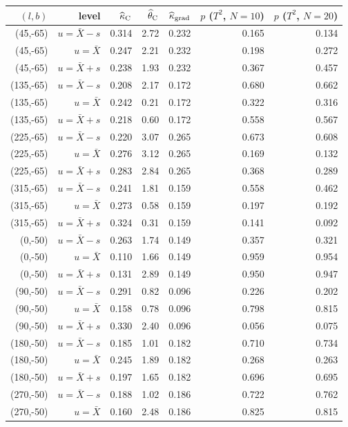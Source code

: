 \begin{tabular}{rrrrrrr}
\hline
$(l,b)$ & level & $\widehat\kappa_{\rm C}$ & $\widehat\theta_{\rm C}$ & $\widehat\kappa_{\rm grad}$ & $p$ ($T^2$, $N=10$) & $p$ ($T^2$, $N=20$) \\
\hline
(45,-65) & $u=\bar X-s$ & 0.314 & 2.72 & 0.232 & 0.165 & 0.134 \\
(45,-65) & $u=\bar X$ & 0.247 & 2.21 & 0.232 & 0.198 & 0.272 \\
(45,-65) & $u=\bar X+s$ & 0.238 & 1.93 & 0.232 & 0.367 & 0.457 \\
(135,-65) & $u=\bar X-s$ & 0.208 & 2.17 & 0.172 & 0.680 & 0.662 \\
(135,-65) & $u=\bar X$ & 0.242 & 0.21 & 0.172 & 0.322 & 0.316 \\
(135,-65) & $u=\bar X+s$ & 0.218 & 0.60 & 0.172 & 0.558 & 0.567 \\
(225,-65) & $u=\bar X-s$ & 0.220 & 3.07 & 0.265 & 0.673 & 0.608 \\
(225,-65) & $u=\bar X$ & 0.276 & 3.12 & 0.265 & 0.169 & 0.132 \\
(225,-65) & $u=\bar X+s$ & 0.283 & 2.84 & 0.265 & 0.368 & 0.289 \\
(315,-65) & $u=\bar X-s$ & 0.241 & 1.81 & 0.159 & 0.558 & 0.462 \\
(315,-65) & $u=\bar X$ & 0.273 & 0.58 & 0.159 & 0.197 & 0.192 \\
(315,-65) & $u=\bar X+s$ & 0.324 & 0.31 & 0.159 & 0.141 & 0.092 \\
(0,-50) & $u=\bar X-s$ & 0.263 & 1.74 & 0.149 & 0.357 & 0.321 \\
(0,-50) & $u=\bar X$ & 0.110 & 1.66 & 0.149 & 0.959 & 0.954 \\
(0,-50) & $u=\bar X+s$ & 0.131 & 2.89 & 0.149 & 0.950 & 0.947 \\
(90,-50) & $u=\bar X-s$ & 0.291 & 0.82 & 0.096 & 0.226 & 0.202 \\
(90,-50) & $u=\bar X$ & 0.158 & 0.78 & 0.096 & 0.798 & 0.815 \\
(90,-50) & $u=\bar X+s$ & 0.330 & 2.40 & 0.096 & 0.056 & 0.075 \\
(180,-50) & $u=\bar X-s$ & 0.185 & 1.01 & 0.182 & 0.710 & 0.734 \\
(180,-50) & $u=\bar X$ & 0.245 & 1.89 & 0.182 & 0.268 & 0.263 \\
(180,-50) & $u=\bar X+s$ & 0.197 & 1.65 & 0.182 & 0.696 & 0.695 \\
(270,-50) & $u=\bar X-s$ & 0.188 & 1.02 & 0.186 & 0.722 & 0.762 \\
(270,-50) & $u=\bar X$ & 0.160 & 2.48 & 0.186 & 0.825 & 0.815 \\

\end{tabular}
